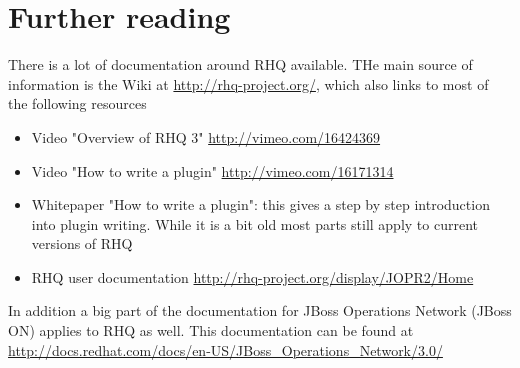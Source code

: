 \documentclass[twocolumn,10pt,a4paper]{article}
\begin{document}
\section{Further reading}

There is a lot of documentation around RHQ available. THe main source of information is the Wiki at \url{http://rhq-project.org/}, which also links to most of the following resources

\begin{itemize}
\item Video "Overview of RHQ 3" \url{http://vimeo.com/16424369}
\item Video "How to write a plugin" \url{http://vimeo.com/16171314}
\item Whitepaper "How to write a plugin": this gives a step by step introduction into plugin writing. While it is a bit old most parts still apply to current versions of RHQ
\item RHQ user documentation \url{http://rhq-project.org/display/JOPR2/Home}
\end{itemize}

In addition a big part of the documentation for JBoss Operations Network (JBoss ON) applies to RHQ as well. This documentation can be found at \url{http://docs.redhat.com/docs/en-US/JBoss_Operations_Network/3.0/}
\end{document}
